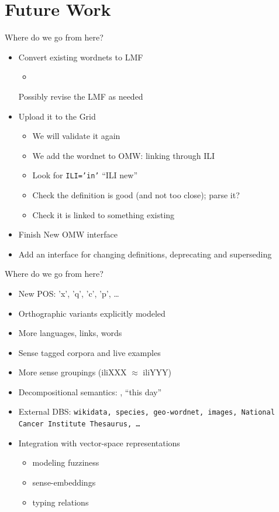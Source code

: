 \documentclass{beamer}
\begin{document}
\section{Future Work}
\begin{frame}{Where do we go from here?}
  \begin{itemize}
  \item Convert existing wordnets to LMF
    \begin{itemize}
    \item \Large {}
    \end{itemize}
    \small Possibly revise the LMF as needed
  \item Upload it to the Grid
    \begin{itemize}
    \item We will validate it again
    \item We add the wordnet to OMW: linking through ILI
    \item Look for \texttt{ILI='in'} ``ILI new''
    \item Check the definition is good (and not too close); parse it?
    \item Check it is linked to something existing
    \end{itemize}
  \item Finish New OMW interface
  \item Add an interface for changing definitions, deprecating and
    superseding
  \end{itemize}
\end{frame}


\begin{frame}{Where do we go from here?}
  \begin{itemize}
  \item New POS: 'x', 'q', 'c', 'p', \ldots
  \item Orthographic variants explicitly modeled
  \item More languages, links, words
  \item Sense tagged corpora and live examples
  \item More sense groupings  (iliXXX $\approx$ iliYYY) 
  \item Decompositional semantics: ,  ``this day'' 
  \item External DBS: \texttt{wikidata, species, geo-wordnet, images, National
      Cancer Institute Thesaurus, \ldots}
  \item Integration with vector-space representations
    \begin{itemize}
    \item modeling fuzziness
    \item sense-embeddings
    \item typing relations
    \end{itemize}
  \end{itemize}
\end{frame}
\end{document}
